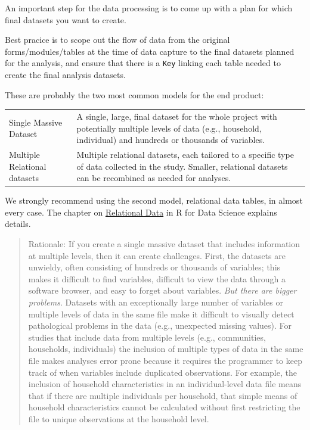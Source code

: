 \documentclass[]{book}
\begin{document}
An important step for the data processing is to come up with a plan for which final datasets you want to create.

Best pracice is to scope out the flow of data from the original forms/modules/tables at the time of data capture to the final datasets planned for the analysis, and ensure that there is a \texttt{Key} linking each table needed to create the final analysis datasets.

These are probably the two most common models for the end product:

\begin{longtable}[]{@{}ll@{}}
\toprule
\endhead
\begin{minipage}[t]{0.18\columnwidth}\raggedright
Single Massive Dataset\strut
\end{minipage} & \begin{minipage}[t]{0.76\columnwidth}\raggedright
A single, large, final dataset for the whole project with potentially multiple levels of data (e.g., household, individual) and hundreds or thousands of variables.\strut
\end{minipage}\tabularnewline
\begin{minipage}[t]{0.18\columnwidth}\raggedright
Multiple Relational datasets\strut
\end{minipage} & \begin{minipage}[t]{0.76\columnwidth}\raggedright
Multiple relational datasets, each tailored to a specific type of data collected in the study. Smaller, relational datasets can be recombined as needed for analyses.\strut
\end{minipage}\tabularnewline
\bottomrule
\end{longtable}

We strongly recommend using the second model, relational data tables, in almost every case. The chapter on \href{https://r4ds.had.co.nz/relational-data.html}{Relational Data} in R for Data Science explains details.

\begin{quote}
Rationale: If you create a single massive dataset that includes information at multiple levels, then it can create challenges. First, the datasets are unwieldy, often consisting of hundreds or thousands of variables; this makes it difficult to find variables, difficult to view the data through a software browser, and easy to forget about variables. \emph{But there are bigger problems}. Datasets with an exceptionally large number of variables or multiple levels of data in the same file make it difficult to visually detect pathological problems in the data (e.g., unexpected missing values). For studies that include data from multiple levels (e.g., communities, households, individuals) the inclusion of multiple types of data in the same file makes analyses error prone because it requires the programmer to keep track of when variables include duplicated observations. For example, the inclusion of household characteristics in an individual-level data file means that if there are multiple individuals per household, that simple means of household characteristics cannot be calculated without first restricting the file to unique observations at the household level.
\end{quote}
\end{document}

